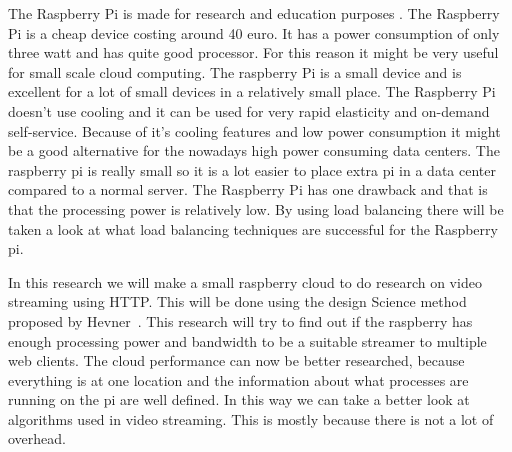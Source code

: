 \documentclass{sig-alternate-br}
\begin{document}
The Raspberry Pi is made for research and education purposes \cite{raspberry-pi}. The Raspberry Pi is a cheap device costing around 40 euro. It has a power consumption of only three watt and has quite good processor. For this reason it might be very useful for small scale cloud computing. The raspberry Pi is a small device and is excellent for a lot of small devices in a relatively small place. The Raspberry Pi doesn't use cooling and it can be used for very rapid elasticity and on-demand self-service. Because of it's cooling features and low power consumption it might be a good alternative for the nowadays high power consuming data centers. The raspberry pi is really small so it is a lot easier to place extra pi in a data center compared to a normal server. The Raspberry Pi has one drawback and that is that the processing power is relatively low. By using load balancing there will be taken a look at what load balancing techniques are successful for the Raspberry pi. 

In this research we will make a small raspberry cloud to do research on video streaming using HTTP. This will be done using the design Science method proposed by Hevner~\cite{hevner:2007}.  This research will try to find out if the raspberry has enough processing power and bandwidth to be a suitable streamer to multiple web clients. The cloud performance can now be better researched, because everything is at one location and the information about what processes are running on the pi are well defined. In this way we can take a better look at algorithms used in video streaming. This is mostly because there is not a lot of overhead. 


%
%
\vspace{50 mm}
\newpage
\end{document}

